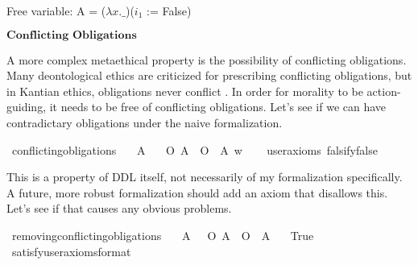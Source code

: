 \begin{isabellebody}
{  Free variable:
    A = ($\lambda x. \_$)($i_1$ := False) \color{black}%
}\isanewline
%
%
\endisatagproof
{\isafoldproof}%
%
\isadelimproof
%
\endisadelimproof
%
\begin{isamarkuptext}%
$\textbf{Conflicting Obligations}$%
\end{isamarkuptext}\isamarkuptrue%
%
\begin{isamarkuptext}%
A more complex metaethical property is the possibility of conflicting obligations. Many deontological
ethics are criticized for prescribing conflicting obligations, but in Kantian ethics, 
obligations never conflict \cite{contradictoryob}. In order for morality to be action-guiding, it needs to be free of 
conflicting obligations. Let's see if we can have contradictary obligations under the naive formalization.%
\end{isamarkuptext}\isamarkuptrue%
\isamarkupfalse%
\ conflicting{\isacharunderscore}obligations{\isacharcolon}\isanewline
\ \ \ A\isanewline
\ \ \ {\isachardoublequoteopen}{\isacharparenleft}O\ {\isacharbraceleft}A{\isacharbraceright}\ \isactrlbold {\isasymand}\ O\ {\isacharbraceleft}\isactrlbold {\isasymnot}\ A{\isacharbraceright}{\isacharparenright}\ w{\isachardoublequoteclose}\isanewline
\ \ \isamarkupfalse%
\ {\isacharbrackleft}user{\isacharunderscore}axioms{\isacharcomma}\ falsify{\isacharequal}false{\isacharbrackright}%
\isadelimproof
\ %
\endisadelimproof
%
\isatagproof
{}\isamarkupfalse%
\isanewline
%
\isanewline
%
%
\endisatagproof
{\isafoldproof}%
%
\isadelimproof
%
\endisadelimproof
%
\begin{isamarkuptext}%
This is a property of DDL itself, not necessarily of my formalization specifically. A future, 
more robust formalization should add an axiom that disallows this. Let's see if that causes any obvious 
problems.%
\end{isamarkuptext}\isamarkuptrue%
\isamarkupfalse%
\ removing{\isacharunderscore}conflicting{\isacharunderscore}obligations{\isacharcolon}\isanewline
\ \ \ {\isachardoublequoteopen}{\isasymforall}A{\isachardot}\ {\isasymTurnstile}\ {\isacharparenleft}\isactrlbold {\isasymnot}\ {\isacharparenleft}O\ {\isacharbraceleft}A{\isacharbraceright}\ \isactrlbold {\isasymand}\ O\ {\isacharbraceleft}\isactrlbold {\isasymnot}\ A{\isacharbraceright}{\isacharparenright}{\isacharparenright}{\isachardoublequoteclose}\isanewline
\ \ \ True\isanewline
\ \ \isamarkupfalse%
\ {\isacharbrackleft}satisfy{\isacharcomma}user{\isacharunderscore}axioms{\isacharcomma}format{\isacharequal}{}{\isacharbrackright}%
\isadelimproof
\ %
\endisadelimproof
%
\isatagproof
{}\isamarkupfalse%
\isanewline
%
\end{isabellebody}
